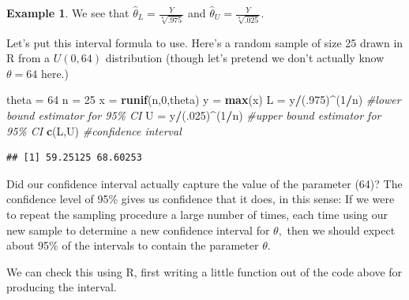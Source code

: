 \documentclass[
]{book}
\newenvironment{Shaded}{\begin{snugshade}}{\end{snugshade}}
\newcommand{\CommentTok}[1]{\textcolor[rgb]{0.56,0.35,0.01}{\textit{#1}}}
\newcommand{\DecValTok}[1]{\textcolor[rgb]{0.00,0.00,0.81}{#1}}
\newcommand{\FunctionTok}[1]{\textcolor[rgb]{0.13,0.29,0.53}{\textbf{#1}}}
\newcommand{\NormalTok}[1]{#1}
\newcommand{\OtherTok}[1]{\textcolor[rgb]{0.56,0.35,0.01}{#1}}
\newcommand{\SpecialCharTok}[1]{\textcolor[rgb]{0.81,0.36,0.00}{\textbf{#1}}}
\theoremstyle{definition}
\theoremstyle{definition}
\newtheorem{example}{Example}[chapter]
\theoremstyle{definition}
\theoremstyle{definition}
\theoremstyle{remark}
\begin{document}
\begin{example}
We see that \(\hat{\theta}_L = \frac{Y}{\sqrt[n]{.975}}\) and \(\hat{\theta}_U = \frac{Y}{\sqrt[n]{.025}}\).

Let's put this interval formula to use. Here's a random sample of size 25 drawn in R from a \(U(0,64)\) distribution (though let's pretend we don't actually know \(\theta = 64\) here.)

\begin{Shaded}
\begin{Highlighting}[]
\NormalTok{theta }\OtherTok{=} \DecValTok{64}
\NormalTok{n }\OtherTok{=} \DecValTok{25}
\NormalTok{x }\OtherTok{=} \FunctionTok{runif}\NormalTok{(n,}\DecValTok{0}\NormalTok{,theta)}
\NormalTok{y }\OtherTok{=} \FunctionTok{max}\NormalTok{(x)}
\NormalTok{L }\OtherTok{=}\NormalTok{ y}\SpecialCharTok{/}\NormalTok{(.}\DecValTok{975}\NormalTok{)}\SpecialCharTok{\^{}}\NormalTok{(}\DecValTok{1}\SpecialCharTok{/}\NormalTok{n) }\CommentTok{\#lower bound estimator for 95\% CI}
\NormalTok{U }\OtherTok{=}\NormalTok{ y}\SpecialCharTok{/}\NormalTok{(.}\DecValTok{025}\NormalTok{)}\SpecialCharTok{\^{}}\NormalTok{(}\DecValTok{1}\SpecialCharTok{/}\NormalTok{n) }\CommentTok{\#upper bound estimator for 95\% CI}
\FunctionTok{c}\NormalTok{(L,U) }\CommentTok{\#confidence interval}
\end{Highlighting}
\end{Shaded}

\begin{verbatim}
## [1] 59.25125 68.60253
\end{verbatim}

Did our confidence interval actually capture the value of the parameter (64)?
The confidence level of 95\% gives us confidence that it does, in this sense: If we were to repeat the sampling procedure a large number of times, each time using our new sample to determine a new confidence interval for \(\theta,\) then we should expect about 95\% of the intervals to contain the parameter \(\theta\).

We can check this using R, first writing a little function out of the code above for producing the interval.


\end{example}
\end{document}
